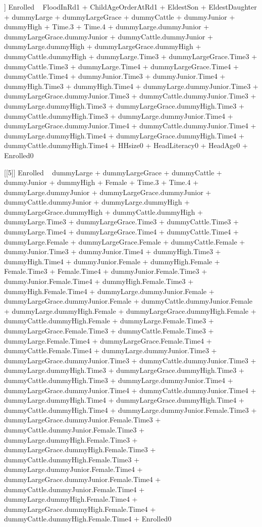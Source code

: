 \begin{Schunk}
\begin{Soutput}
[[4]]
Enrolled ~ FloodInRd1 + ChildAgeOrderAtRd1 + EldestSon + EldestDaughter + 
    dummyLarge + dummyLargeGrace + dummyCattle + dummyJunior + 
    dummyHigh + Time.3 + Time.4 + dummyLarge.dummyJunior + dummyLargeGrace.dummyJunior + 
    dummyCattle.dummyJunior + dummyLarge.dummyHigh + dummyLargeGrace.dummyHigh + 
    dummyCattle.dummyHigh + dummyLarge.Time3 + dummyLargeGrace.Time3 + 
    dummyCattle.Time3 + dummyLarge.Time4 + dummyLargeGrace.Time4 + 
    dummyCattle.Time4 + dummyJunior.Time3 + dummyJunior.Time4 + 
    dummyHigh.Time3 + dummyHigh.Time4 + dummyLarge.dummyJunior.Time3 + 
    dummyLargeGrace.dummyJunior.Time3 + dummyCattle.dummyJunior.Time3 + 
    dummyLarge.dummyHigh.Time3 + dummyLargeGrace.dummyHigh.Time3 + 
    dummyCattle.dummyHigh.Time3 + dummyLarge.dummyJunior.Time4 + 
    dummyLargeGrace.dummyJunior.Time4 + dummyCattle.dummyJunior.Time4 + 
    dummyLarge.dummyHigh.Time4 + dummyLargeGrace.dummyHigh.Time4 + 
    dummyCattle.dummyHigh.Time4 + HHsize0 + HeadLiteracy0 + HeadAge0 + 
    Enrolled0

[[5]]
Enrolled ~ dummyLarge + dummyLargeGrace + dummyCattle + dummyJunior + 
    dummyHigh + Female + Time.3 + Time.4 + dummyLarge.dummyJunior + 
    dummyLargeGrace.dummyJunior + dummyCattle.dummyJunior + dummyLarge.dummyHigh + 
    dummyLargeGrace.dummyHigh + dummyCattle.dummyHigh + dummyLarge.Time3 + 
    dummyLargeGrace.Time3 + dummyCattle.Time3 + dummyLarge.Time4 + 
    dummyLargeGrace.Time4 + dummyCattle.Time4 + dummyLarge.Female + 
    dummyLargeGrace.Female + dummyCattle.Female + dummyJunior.Time3 + 
    dummyJunior.Time4 + dummyHigh.Time3 + dummyHigh.Time4 + dummyJunior.Female + 
    dummyHigh.Female + Female.Time3 + Female.Time4 + dummyJunior.Female.Time3 + 
    dummyJunior.Female.Time4 + dummyHigh.Female.Time3 + dummyHigh.Female.Time4 + 
    dummyLarge.dummyJunior.Female + dummyLargeGrace.dummyJunior.Female + 
    dummyCattle.dummyJunior.Female + dummyLarge.dummyHigh.Female + 
    dummyLargeGrace.dummyHigh.Female + dummyCattle.dummyHigh.Female + 
    dummyLarge.Female.Time3 + dummyLargeGrace.Female.Time3 + 
    dummyCattle.Female.Time3 + dummyLarge.Female.Time4 + dummyLargeGrace.Female.Time4 + 
    dummyCattle.Female.Time4 + dummyLarge.dummyJunior.Time3 + 
    dummyLargeGrace.dummyJunior.Time3 + dummyCattle.dummyJunior.Time3 + 
    dummyLarge.dummyHigh.Time3 + dummyLargeGrace.dummyHigh.Time3 + 
    dummyCattle.dummyHigh.Time3 + dummyLarge.dummyJunior.Time4 + 
    dummyLargeGrace.dummyJunior.Time4 + dummyCattle.dummyJunior.Time4 + 
    dummyLarge.dummyHigh.Time4 + dummyLargeGrace.dummyHigh.Time4 + 
    dummyCattle.dummyHigh.Time4 + dummyLarge.dummyJunior.Female.Time3 + 
    dummyLargeGrace.dummyJunior.Female.Time3 + dummyCattle.dummyJunior.Female.Time3 + 
    dummyLarge.dummyHigh.Female.Time3 + dummyLargeGrace.dummyHigh.Female.Time3 + 
    dummyCattle.dummyHigh.Female.Time3 + dummyLarge.dummyJunior.Female.Time4 + 
    dummyLargeGrace.dummyJunior.Female.Time4 + dummyCattle.dummyJunior.Female.Time4 + 
    dummyLarge.dummyHigh.Female.Time4 + dummyLargeGrace.dummyHigh.Female.Time4 + 
    dummyCattle.dummyHigh.Female.Time4 + Enrolled0


\end{Soutput}
\end{Schunk}
